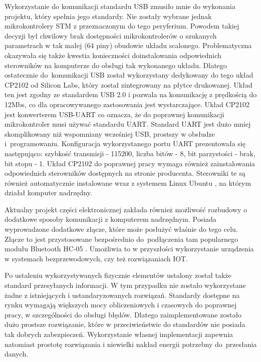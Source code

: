 Wykorzystanie do komunikacji standardu USB zmusiło mnie do wykonania projektu, który spełnia jego standardy. Nie zostały wybrane jednak mikrokontrolery STM z przeznaczonym do tego peryferium. Powodem takiej decyzji był chwilowy brak dostępności mikrokontrolerów o szukanych parametrach w tak małej (64 piny) obudowie układu scalonego. Problematyczna okazywała się także kwestia konieczności doinstalowania odpowiednich sterowników na komputerze do obsługi tak wykonanego układu. Dlatego ostatecznie do~komunikacji USB został wykorzystany dedykowany do tego układ CP2102 od Silicon Labs, który został zintegrowany na płytce drukowanej. Układ ten jest zgodny ze standardem USB 2.0 i pozwala na komunikację z prędkością do 12Mbs, co dla opracowywanego zastosowania jest wystarczające. Układ CP2102 jest konwerterem USB-UART co oznacza, że do poprawnej komunikacji mikrokontroler musi używać standardu UART. Standard UART jest dużo mniej skomplikowany niż wspomniany wcześniej USB, prostszy w obsłudze i~programowaniu. Konfiguracja wykorzystanego portu UART prezentowała się następująco: szybkość transmisji - 115200, liczba bitów - 8, bit parzystości - brak, bit stopu - 1. Układ CP2102 do poprawnej pracy wymaga również zainstalowania odpowiednich sterowników dostępnych na stronie producenta. Sterowniki te są również automatycznie instalowane wraz z systemem Linux Ubuntu \cite{b_site_CP2102}, na którym działał komputer nadrzędny.

Aktualny projekt części elektronicznej zakłada również możliwość rozbudowy o dodatkowe sposoby komunikacji z komputerem nadrzędnym. Posiada wyprowadzone dodatkowe złącze, które może posłużyć właśnie do tego celu. Złącze to jest przystosowane bezpośrednio do~podłączenia tam popularnego modułu Bluetooth HC-05 \cite{b_site_HC-05_sklep}. Umożliwia to w przyszłości wykorzystanie urządzenia w systemach bezprzewodowych, czy też rozwiązaniach IOT.

Po ustaleniu wykorzystywanych fizycznie elementów ustalony został także standard przesyłanych informacji. W tym przypadku nie zostało wykorzystane żadne z istniejących i ustandaryzowanych rozwiązań. Standardy dostępne na rynku wymagają większych mocy obliczeniowych i czasowych do poprawnej pracy, w szczególności do obsługi błędów.
Dlatego zaimplementowane zostało dużo prostsze rozwiązanie, które w przeciwieństwie do standardów nie posiada tak dobrych zabezpieczeń. Wykorzystanie własnej implementacji zapewnia natomiast prostotę rozwiązania i niewielki nakład energii potrzebny do~przesłania danych.

